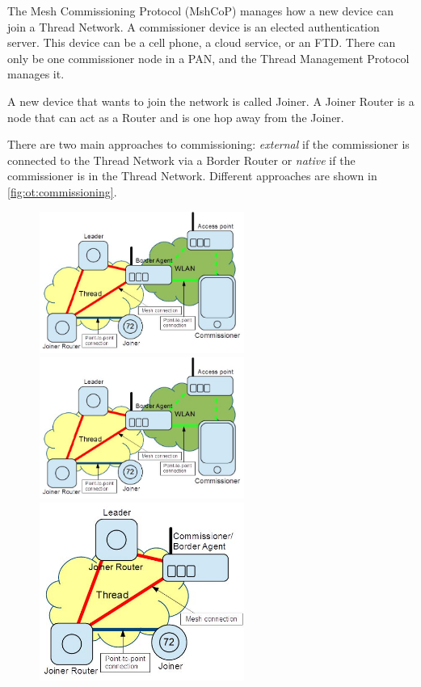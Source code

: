 The Mesh Commissioning Protocol (MshCoP) manages how a new device can join a Thread Network.
A commissioner device is an elected authentication server.
This device can be a cell phone, a cloud service, or an FTD.
There can only be one commissioner node in a PAN, and the Thread Management Protocol manages it.

A new device that wants to join the network is called Joiner.
A Joiner Router is a node that can act as a Router and is one hop away from the Joiner.

There are two main approaches to commissioning:
\emph{external} if the commissioner is connected to the Thread Network via a Border Router or
\emph{native} if the commissioner is in the Thread Network. 
Different approaches are shown in \autoref{fig:ot:commissioning}.

\begin{figure}[!ht]
	\centering
	\includegraphics[width=67mm, keepaspectratio]{figures/external1-Final_12639Thread_1.3.jpg}\hspace{1cm}
	\includegraphics[width=67mm, keepaspectratio]{figures/external1-Final_12639Thread_1.3.jpg}\\\vspace{5mm}
	\includegraphics[width=67mm, keepaspectratio]{figures/native1-Final_12639Thread_1.3.jpg}\hspace{1cm}

\end{figure}
